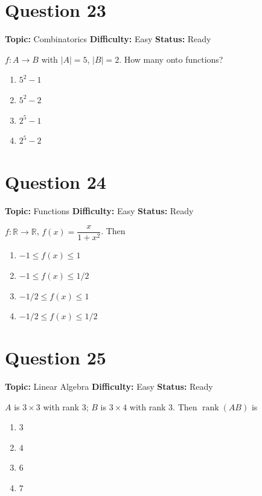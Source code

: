\documentclass[11pt]{article}
\begin{document}
\newpage

\section*{Question 23}


\noindent\textbf{Topic:} Combinatorics \quad \textbf{Difficulty:} Easy \quad \textbf{Status:} Ready



$f : A \to B$ with $|A|=5$, $|B|=2$. How many onto functions?
\begin{enumerate}[label=(\Alph*)]
\item $5^2 - 1$
\item $5^2 - 2$
\item $2^5 - 1$
\item $2^5 - 2$
\end{enumerate}

\newpage

\section*{Question 24}


\noindent\textbf{Topic:} Functions \quad \textbf{Difficulty:} Easy \quad \textbf{Status:} Ready



$f : \mathbb R \to \mathbb R$, $f(x) = \dfrac{x}{1+x^2}$. Then
\begin{enumerate}[label=(\Alph*)]
\item $-1 \leq f(x) \leq 1$
\item $-1 \leq f(x) \leq 1/2$
\item $-1/2 \leq f(x) \leq 1$
\item $-1/2 \leq f(x) \leq 1/2$
\end{enumerate}

\newpage

\section*{Question 25}


\noindent\textbf{Topic:} Linear Algebra \quad \textbf{Difficulty:} Easy \quad \textbf{Status:} Ready



$A$ is $3 \times 3$ with rank $3$; $B$ is $3 \times 4$ with rank $3$. Then $\operatorname{rank}(AB)$ is
\begin{enumerate}[label=(\Alph*)]
\item $3$
\item $4$
\item $6$
\item $7$
\end{enumerate}
\end{document}
